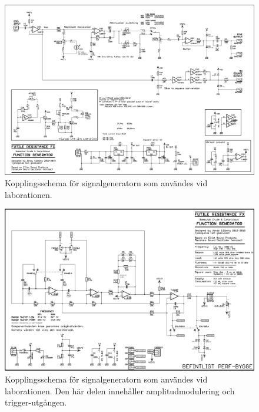 \begin{figure}\label{fig:siggen-schem-1}
 \centering
 \includegraphics[width=\linewidth]{img/signal-generator_schematic-1}
 \caption{Kopplingsschema för signalgeneratorn som användes vid laborationen.}
\end{figure}

\begin{figure}\label{fig:siggen-schem-2}
 \centering
 \includegraphics[width=\linewidth]{img/signal-generator_schematic-2}
 \caption{Kopplingsschema för signalgeneratorn som användes vid laborationen.
 Den här delen innehåller amplitudmodulering och trigger-utgången.}
\end{figure}


